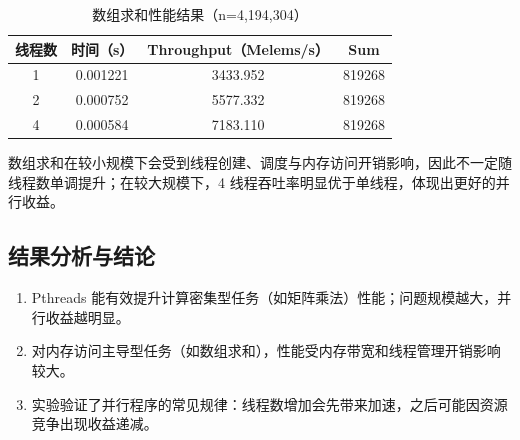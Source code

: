 \documentclass[12pt,a4paper]{ctexart}
\begin{document}
\begin{table}[h]
\centering
\caption{数组求和性能结果（n=4,194,304）}
\begin{tabular}{cccc}
\toprule
线程数 & 时间（s） & Throughput（Melems/s） & Sum \\
\midrule
1 & 0.001221 & 3433.952 & 819268 \\
2 & 0.000752 & 5577.332 & 819268 \\
4 & 0.000584 & 7183.110 & 819268 \\
\bottomrule
\end{tabular}
\end{table}

数组求和在较小规模下会受到线程创建、调度与内存访问开销影响，因此不一定随线程数单调提升；在较大规模下，4 线程吞吐率明显优于单线程，体现出更好的并行收益。

\subsection{结果分析与结论}
\begin{enumerate}
    \item Pthreads 能有效提升计算密集型任务（如矩阵乘法）性能；问题规模越大，并行收益越明显。
    \item 对内存访问主导型任务（如数组求和），性能受内存带宽和线程管理开销影响较大。
    \item 实验验证了并行程序的常见规律：线程数增加会先带来加速，之后可能因资源竞争出现收益递减。
\end{enumerate}
\end{document}
